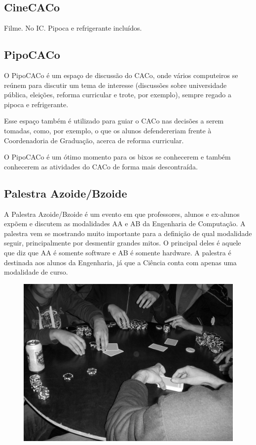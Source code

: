 \subsection{CineCACo}

Filme. No IC. Pipoca e refrigerante incluídos.

\subsection{PipoCACo}

O PipoCACo é um espaço de discussão do CACo, onde vários computeiros se reúnem
para discutir um tema de interesse (discussões sobre universidade pública,
eleições, reforma curricular e trote, por exemplo), sempre regado a pipoca
e refrigerante.

Esse espaço também é utilizado para guiar o CACo nas decisões a serem tomadas,
como, por exemplo, o que os alunos defendereriam frente à Coordenadoria de
Graduação, acerca de reforma curricular.

O PipoCACo é um ótimo momento para os bixos se conhecerem e também
conhecerem as atividades do CACo de forma mais descontraída.

\subsection{Palestra Azoide/Bzoide}

A Palestra Azoide/Bzoide é um evento em que professores, alunos e ex-alunos expõem
e discutem as modalidades AA e AB da Engenharia de Computação. A palestra vem se mostrando muito importante
para a definição de qual modalidade seguir, principalmente por desmentir grandes
mitos. O principal deles é aquele que diz que AA é somente software e AB
é somente hardware. A palestra é destinada aos alunos da Engenharia,
já que a Ciência conta com apenas uma modalidade de curso.
\begin{figure}[h!]
    \vspace{0pt}
    \centering
    \includegraphics[scale=0.55, keepaspectratio=true]{img/imgs/21-CACo/poker.jpg}
    \vspace{-10pt}
\end{figure}



